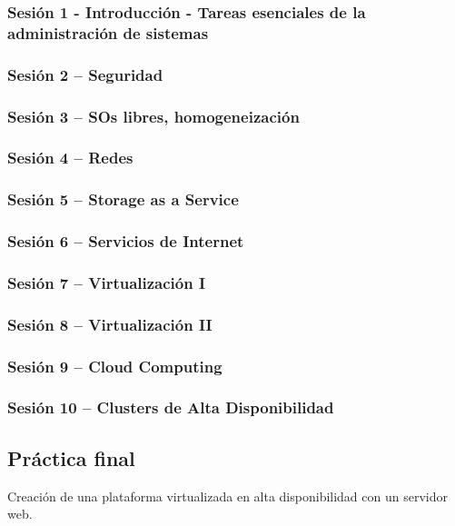 \documentclass[a4paper]{article}
\begin{document}
      \subsubsection{Sesión 1 - Introducción - Tareas esenciales de la administración de sistemas}
         
      \subsubsection{Sesión 2 -- Seguridad}
      \subsubsection{Sesión 3 -- SOs libres, homogeneización}
      \subsubsection{Sesión 4 -- Redes}
      \subsubsection{Sesión 5 -- Storage as a Service}
      \subsubsection{Sesión 6 -- Servicios de Internet}
      \subsubsection{Sesión 7 -- Virtualización I}
      \subsubsection{Sesión 8 -- Virtualización II}
      \subsubsection{Sesión 9 -- Cloud Computing}
      \subsubsection{Sesión 10 -- Clusters de Alta Disponibilidad}

    \subsection{Práctica final}
      Creación de una plataforma virtualizada en alta disponibilidad con un servidor web.
\end{document}
